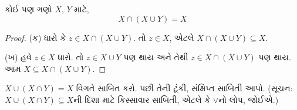 \begin{prop}[અવશોષણ]
કોઈ પણ ગણો $X$, $Y$ માટે,
\[
X \cap (X \cup Y) = X
\]
\end{prop}

\begin{proof}
(ક) ધારો કે $z \in X \cap (X \cup Y)$.
તો $z \in X$, એટલે $X \cap (X \cup Y) \subseteq X$.

(ખ) હવે $z \in X$ ધારો.
તો $z \in X \cup Y$ પણ થાય અને તેથી
$z \in X \cap (X \cup Y)$ પણ થાય.
આમ $X \subseteq X \cap (X \cup Y)$.
\end{proof}

\begin{prob}
$X \cup (X \cap Y) = X$ વિગતે સાબિત કરો.
પછી તેની ટૂંકી, સંક્ષિપ્ત સાબિતી આપો.
(સૂચન: $X \cup (X \cap Y) \subseteq X$ની દિશા માટે
કિસ્સાવાર સાબિતી, એટલે કે $\lor$નો લોપ, જોઈએ.)
\end{prob}
\endgroup
\endgroup


\begingroup
\makeatletter{}\makeatother

\label{guunit:OLP-0011}


\begingroup
\makeatletter{}\makeatother

\label{guunit:OLP-0012}


